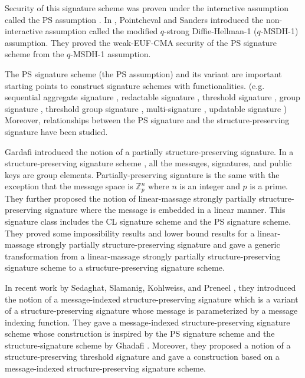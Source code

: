 \documentclass[a4paper,11pt]{fullverllncs}
\begin{document}
Security of this signature scheme was proven under the interactive assumption called the PS assumption \cite{PS16}.
In \cite{PS18}, Pointcheval and Sanders introduced the non-interactive assumption called the modified $q$-strong Diffie-Hellman-1 ($q$-MSDH-1) assumption.
They proved the weak-EUF-CMA security of the PS signature scheme from the $q$-MSDH-1 assumption.

The PS signature scheme (the PS assumption) and its variant are important starting points to construct signature schemes with functionalities.
(e.g. sequential aggregate signature \cite{PS16,McD20}, redactable signature \cite{McD20,San20},  threshold signature \cite{ADEO21}, group signature \cite{CS20,KLAP21,KSAP21,San21,ST21}, threshold group signature \cite{CDLNT20}, multi-signature \cite{CDLNT20}, updatable signature \cite{CRSST21})
Moreover, relationships between the PS signature and the structure-preserving signature have been studied.

Gardafi \cite{Gha21} introduced the notion of a partially structure-preserving signature. 
In a structure-preserving signature scheme \cite{AFGHO10}, all the messages, signatures, and public keys are group elements.
Partially-preserving signature is the same with the exception that the message space is $\mathbb{Z}^n_{p}$ where $n$ is an integer and $p$ is a prime.
They further proposed the notion of linear-massage strongly partially structure-preserving signature where the message is embedded in a linear manner.
This signature class includes the CL signature scheme and the PS signature scheme.
They proved some impossibility results and lower bound results for a linear-massage strongly partially structure-preserving signature and gave a generic transformation from a linear-massage strongly partially structure-preserving signature scheme to a structure-preserving signature scheme.

In recent work by Sedaghat, Slamanig, Kohlweiss, and Preneel \cite{SSKP22}, they introduced the notion of  a message-indexed structure-preserving signature which is a variant of a structure-preserving signature whose message is parameterized by a message indexing function. 
They gave a message-indexed structure-preserving signature scheme whose construction is inspired by the PS signature scheme and the structure-signature scheme by Ghadafi \cite{Gha16}.
Moreover, they proposed a notion of a structure-preserving threshold signature and gave a construction based on a message-indexed structure-preserving signature scheme.
\end{document}
